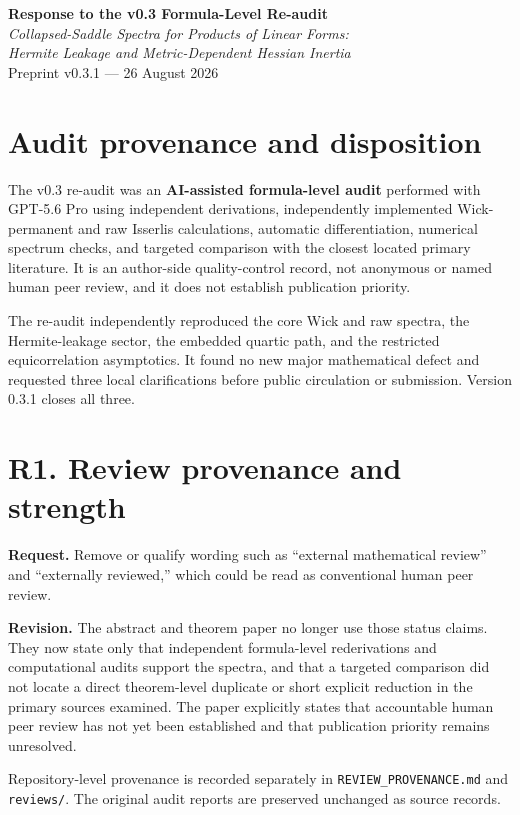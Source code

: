 \documentclass[11pt]{article}
\begin{document}
\begin{center}
{\Large\bfseries Response to the v0.3 Formula-Level Re-audit}\\[0.4em]
{\large \emph{Collapsed-Saddle Spectra for Products of Linear Forms:\\ Hermite Leakage and Metric-Dependent Hessian Inertia}}\\[0.35em]
Preprint v0.3.1 --- 26 August 2026
\end{center}

\section*{Audit provenance and disposition}
The v0.3 re-audit was an \textbf{AI-assisted formula-level audit} performed with GPT-5.6 Pro using independent derivations, independently implemented Wick-permanent and raw Isserlis calculations, automatic differentiation, numerical spectrum checks, and targeted comparison with the closest located primary literature.  It is an author-side quality-control record, not anonymous or named human peer review, and it does not establish publication priority.

The re-audit independently reproduced the core Wick and raw spectra, the Hermite-leakage sector, the embedded quartic path, and the restricted equicorrelation asymptotics.  It found no new major mathematical defect and requested three local clarifications before public circulation or submission.  Version 0.3.1 closes all three.

\section*{R1. Review provenance and strength}
\textbf{Request.} Remove or qualify wording such as ``external mathematical review'' and ``externally reviewed,'' which could be read as conventional human peer review.

\textbf{Revision.} The abstract and theorem paper no longer use those status claims.  They now state only that independent formula-level rederivations and computational audits support the spectra, and that a targeted comparison did not locate a direct theorem-level duplicate or short explicit reduction in the primary sources examined.  The paper explicitly states that accountable human peer review has not yet been established and that publication priority remains unresolved.

Repository-level provenance is recorded separately in \texttt{REVIEW\_PROVENANCE.md} and \texttt{reviews/}.  The original audit reports are preserved unchanged as source records.
\end{document}

